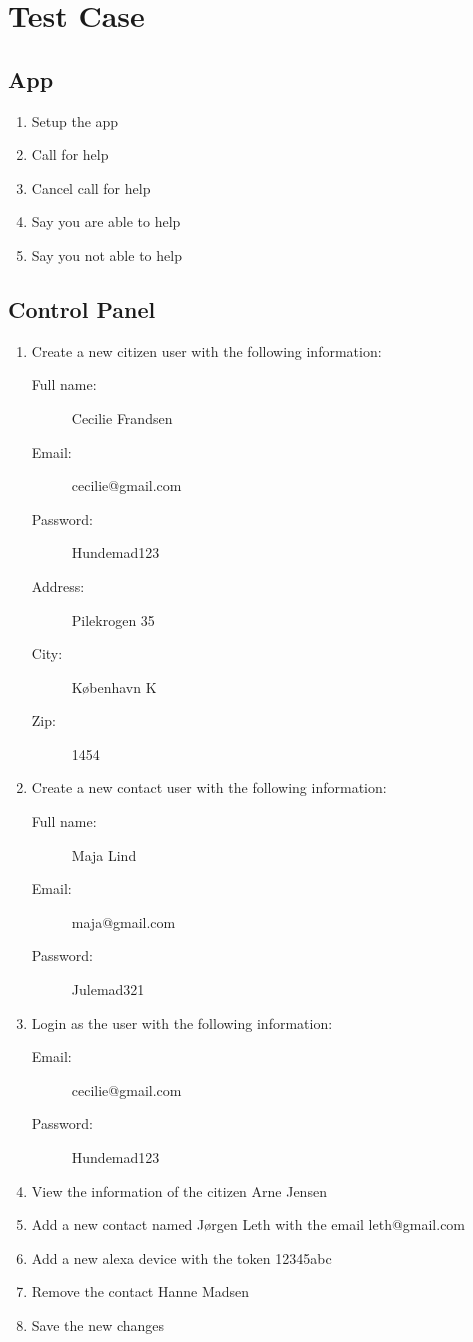 \chapter{Test Case}
\section{App}
\label{bi:appTest}
\begin{enumerate}
    \item Setup the app
    \item Call for help
    \item Cancel call for help
    \item Say you are able to help
    \item Say you not able to help
\end{enumerate}
\section{Control Panel}
\label{bi:controlPanelTest}
\begin{enumerate}
    \item Create a new citizen user with the following information:
    \begin{description}
        \item [Full name:] Cecilie Frandsen
        \item [Email:] cecilie@gmail.com
        \item [Password:] Hundemad123
        \item [Address:] Pilekrogen 35
        \item [City:] København K
        \item [Zip:] 1454
    \end{description}
    \item Create a new contact user with the following information:
    \begin{description}
        \item [Full name:] Maja Lind
        \item [Email:] maja@gmail.com
        \item [Password:] Julemad321
    \end{description}
    \item Login as the user with the following information:
    \begin{description}
        \item [Email:] cecilie@gmail.com
        \item [Password:] Hundemad123
    \end{description}
    \item View the information of the citizen Arne Jensen
    \item Add a new contact named Jørgen Leth with the email leth@gmail.com
    \item Add a new alexa device with the token 12345abc
    \item Remove the contact Hanne Madsen
    \item Save the new changes
\end{enumerate}